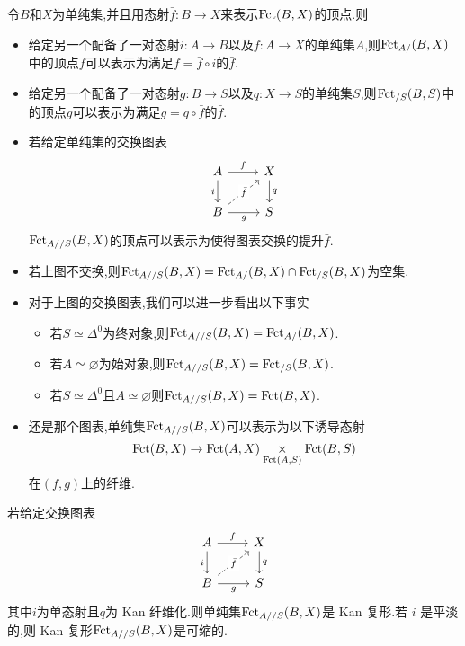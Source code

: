 \begin{remark}
    令$B$和$X$为单纯集,并且用态射$\bar{f} : B \to X$来表示$\operatorname{Fct}(B,X)$的顶点.则
    \begin{itemize}
        \item 给定另一个配备了一对态射$i : A \to B$以及$f : A\to X$的单纯集$A$,则$\operatorname{Fct}_{A/}(B,X)$中的顶点$f$可以表示为满足$f = \bar{f} \circ i$的$\bar{f}$.
        \item 给定另一个配备了一对态射$g : B \to S$以及$q: X \to S$的单纯集$S$,则$\operatorname{Fct}_{/S}(B,S)$中的顶点$g$可以表示为满足$g = q \circ \bar{f}$的$\bar{f}$.
        \item 若给定单纯集的交换图表
        \[\begin{tikzcd}
	A & X \\
	B & S
	\arrow["f", from=1-1, to=1-2]
	\arrow["i"', from=1-1, to=2-1]
	\arrow["q", from=1-2, to=2-2]
	\arrow["{\bar{f}}"{description}, dashed, from=2-1, to=1-2]
	\arrow["g"', from=2-1, to=2-2]
        \end{tikzcd}\]
        $\operatorname{Fct}_{A//S}(B,X)$的顶点可以表示为使得图表交换的提升$\bar{f}$.
        \item 若上图不交换,则$\operatorname{Fct}_{A//S}(B,X) = \operatorname{Fct}_{A/}(B,X) \cap \operatorname{Fct}_{/S}(B,X)$为空集.
        \item 对于上图的交换图表,我们可以进一步看出以下事实
        \begin{itemize}
            \item 若$S \simeq \Delta^0$为终对象,则$\operatorname{Fct}_{A//S}(B,X) = \operatorname{Fct}_{A/}(B,X)$.
            \item 若$A \simeq \varnothing$为始对象,则$\operatorname{Fct}_{A//S}(B,X) = \operatorname{Fct}_{/S}(B,X)$.
            \item 若$S \simeq \Delta^0$且$A\simeq \varnothing$则$\operatorname{Fct}_{A//S}(B,X) = \operatorname{Fct}(B,X)$.
        \end{itemize}
        \item 还是那个图表,单纯集$\operatorname{Fct}_{A//S}(B,X)$可以表示为以下诱导态射
        \[
            \operatorname{Fct}(B,X) \to \operatorname{Fct}(A,X) \underset{\operatorname{Fct}(A,S)}{\times}\operatorname{Fct}(B,S)
        \]
        在$(f,g)$上的纤维.
    \end{itemize}
\end{remark}
\begin{proposition}
    若给定交换图表
    \[\begin{tikzcd}
	A & X \\
	B & S
	\arrow["f", from=1-1, to=1-2]
	\arrow["i"', from=1-1, to=2-1]
	\arrow["q", from=1-2, to=2-2]
	\arrow["{\bar{f}}"{description}, dashed, from=2-1, to=1-2]
	\arrow["g"', from=2-1, to=2-2]
    \end{tikzcd}\]
    其中$i$为单态射且$q$为 Kan 纤维化.则单纯集$\operatorname{Fct}_{A//S}(B,X)$是 Kan 复形.若 $i$ 是平淡的,则 Kan 复形$\operatorname{Fct}_{A//S}(B,X)$是可缩的.
\end{proposition}
